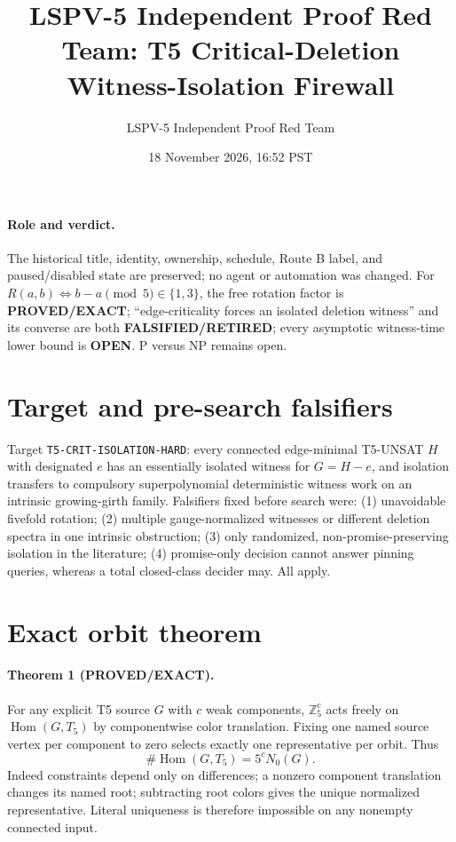 \documentclass[11pt]{article}
\title{LSPV-5 Independent Proof Red Team: T5 Critical-Deletion Witness-Isolation Firewall}
\author{LSPV-5 Independent Proof Red Team}
\date{18 November 2026, 16:52 PST}
\begin{document}
\maketitle

\paragraph{Role and verdict.}
The historical title, identity, ownership, schedule, Route B label, and paused/disabled state are preserved; no agent or automation was changed.  For $R(a,b)\iff b-a\pmod5\in\{1,3\}$, the free rotation factor is \textbf{PROVED/EXACT}; ``edge-criticality forces an isolated deletion witness'' and its converse are both \textbf{FALSIFIED/RETIRED}; every asymptotic witness-time lower bound is \textbf{OPEN}.  P versus NP remains open.

\section{Target and pre-search falsifiers}
Target \texttt{T5-CRIT-ISOLATION-HARD}: every connected edge-minimal T5-UNSAT $H$ with designated $e$ has an essentially isolated witness for $G=H-e$, and isolation transfers to compulsory superpolynomial deterministic witness work on an intrinsic growing-girth family.  Falsifiers fixed before search were: (1) unavoidable fivefold rotation; (2) multiple gauge-normalized witnesses or different deletion spectra in one intrinsic obstruction; (3) only randomized, non-promise-preserving isolation in the literature; (4) promise-only decision cannot answer pinning queries, whereas a total closed-class decider may.  All apply.

\section{Exact orbit theorem}
\paragraph{Theorem 1 (PROVED/EXACT).}
For any explicit T5 source $G$ with $c$ weak components, $\mathbb Z_5^c$ acts freely on $\operatorname{Hom}(G,T_5)$ by componentwise color translation.  Fixing one named source vertex per component to zero selects exactly one representative per orbit.  Thus
\[
 \#\operatorname{Hom}(G,T_5)=5^cN_0(G).
\]
Indeed constraints depend only on differences; a nonzero component translation changes its named root; subtracting root colors gives the unique normalized representative.  Literal uniqueness is therefore impossible on any nonempty connected input.
\end{document}
